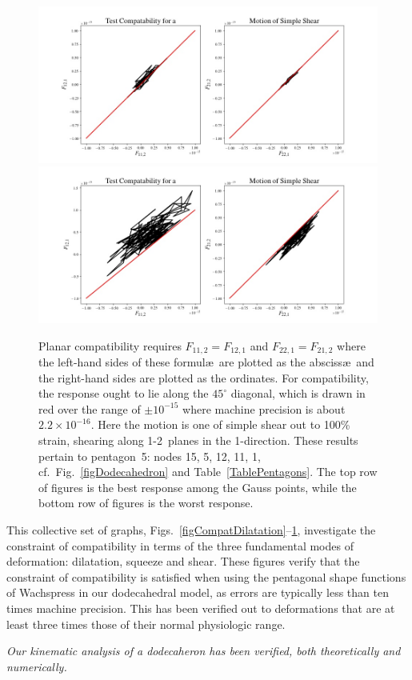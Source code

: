 \begin{figure}
	\centering
	\includegraphics[width=\textwidth]{figures/compatibilitySimpleShearP5G7.jpg}
	\includegraphics[width=\textwidth]{figures/compatibilitySimpleShearP5G5.jpg}
	\caption{Planar compatibility requires $F_{11,2} = F_{12,1}$ and $F_{22,1} = F_{21,2}$ where the left-hand sides of these formul\ae\ are plotted as the absciss\ae\ and the right-hand sides are plotted as the ordinates.  For compatibility, the response ought to lie along the $45^{\circ}$ diagonal, which is drawn in red over the range of $\pm 10^{-15}$ where machine precision is about $2.2 \times 10^{-16}$.  Here the motion is one of simple shear out to 100\% strain, shearing along 1-2~planes in the 1-direction.  These results pertain to pentagon~5: nodes 15, 5, 12, 11, 1, cf.\ Fig.~\ref{figDodecahedron} and Table~\ref{TablePentagons}.  The top row of figures is the best response among the Gauss points, while the bottom row of figures is the worst response.}
	\label{figCompatSimpleShearP5}
\end{figure}

This collective set of graphs, Figs.~\ref{figCompatDilatation}--\ref{figCompatSimpleShearP5}, investigate the constraint of compatibility in terms of the three fundamental modes of deformation: dilatation, squeeze and shear.  These figures verify that the constraint of compatibility is satisfied when using the pentagonal shape functions of Wachspress \cite{Wachspress75,Wachspress16} in our dodecahedral model, as errors are typically less than ten times machine precision.  This has been verified out to deformations that are at least three times those of their normal physiologic range.

\textit{Our kinematic analysis of a dodecaheron has been verified, both theoretically and numerically.}

